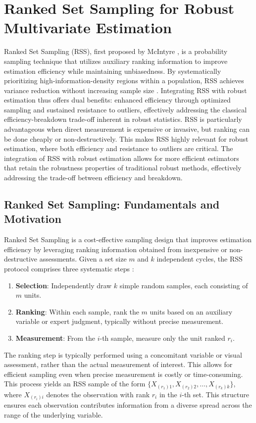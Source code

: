 \documentclass[12pt]{article}
\begin{document}
\section{Ranked Set Sampling for Robust Multivariate Estimation}\label{sec:rss}

Ranked Set Sampling (RSS), first proposed by McIntyre \cite{McIntyre1952},
is a probability sampling technique that utilizes auxiliary ranking information to improve estimation efficiency while maintaining unbiasedness. By systematically prioritizing high-information-density regions within a population, RSS achieves variance reduction without increasing sample size \cite{Alvandi2023}.
Integrating RSS with robust estimation thus offers dual benefits: enhanced efficiency through optimized sampling and sustained resistance to outliers, effectively addressing the classical efficiency-breakdown trade-off inherent in robust statistics.
RSS is particularly advantageous when direct measurement is expensive or invasive, but ranking can be done cheaply or non-destructively. This makes RSS highly relevant for robust estimation, where both efficiency and resistance to outliers are critical.
The integration of RSS with robust estimation allows for more efficient estimators that retain the robustness properties of traditional robust methods, effectively addressing the trade-off between efficiency and breakdown.
\subsection{Ranked Set Sampling: Fundamentals and Motivation}

Ranked Set Sampling is a cost-effective sampling design that improves estimation efficiency by leveraging ranking information obtained from inexpensive or non-destructive assessments. Given a set size $m$ and $k$ independent cycles, the RSS protocol comprises three systematic steps \cite{Wolfe2010}:

\begin{enumerate}
    \item \textbf{Selection}: Independently draw $k$ simple random samples, each consisting of $m$ units.
    \item \textbf{Ranking}: Within each sample, rank the $m$ units based on an auxiliary variable or expert judgment, typically without precise measurement.
    \item \textbf{Measurement}: From the $i$-th sample, measure only the unit ranked $r_i$.
\end{enumerate}
The ranking step is typically performed using a concomitant variable or visual assessment, rather than the actual measurement of interest. This allows for efficient sampling even when precise measurement is costly or time-consuming.
This process yields an RSS sample of the form $\{X_{(r_1)1}, X_{(r_2)2}, \ldots, X_{(r_k)k}\}$, where $X_{(r_i)i}$ denotes the observation with rank $r_i$ in the $i$-th set. This structure ensures each observation contributes information from a diverse spread across the range of the underlying variable.
\end{document}

